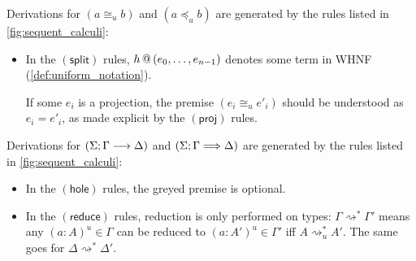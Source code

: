 \documentclass[twoside]{report}
\begin{document}
\begin{definition}
    \label{def:conversion_calculus}
    Derivations for $(a \cong_u b)$ and $(a \preceq_u b)$ are generated by the rules listed in \cref{fig:sequent_calculi}:
    \begin{itemize}
        \item In the $(\mathsf{split})$ rules, ${h}\,@\,({e_0, \ldots, e_{n-1}})$ denotes some term in WHNF (\cref{def:uniform_notation}).

              If some $e_i$ is a projection, the premise $(e_i \cong_u e'_i)$ should be understood as $e_i = e'_i$, as made explicit by the $(\mathsf{proj})$ rules.
    \end{itemize}
\end{definition}

\begin{definition}
    \label{def:typing_calculus}
    Derivations for $(\Sigma; \Gamma \longrightarrow \Delta)$ and $(\Sigma; \Gamma \Longrightarrow \Delta)$ are generated by the rules listed in \cref{fig:sequent_calculi}:
    \begin{itemize}
        \item In the $(\mathsf{hole})$ rules, the greyed premise is optional.

        \item In the $(\mathsf{reduce})$ rules, reduction is only performed on types: $\Gamma \rightsquigarrow^\ast \Gamma'$ means any $(a : A)^u \in \Gamma$ can be reduced to $(a : A')^u \in \Gamma'$ iff $A \rightsquigarrow^\ast_u A'$. The same goes for $\Delta \rightsquigarrow^\ast \Delta'$.
    \end{itemize}
\end{definition}
\end{document}
